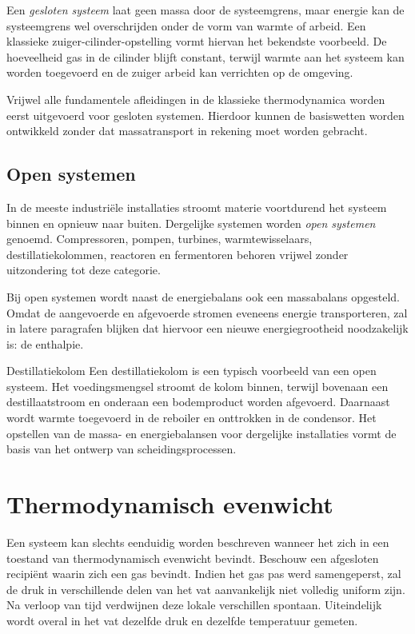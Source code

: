 Een \emph{gesloten systeem} laat geen massa door de systeemgrens, maar energie kan de systeemgrens wel overschrijden onder de vorm van warmte of arbeid. Een klassieke zuiger-cilinder-opstelling vormt hiervan het bekendste voorbeeld. De hoeveelheid gas in de cilinder blijft constant, terwijl warmte aan het systeem kan worden toegevoerd en de zuiger arbeid kan verrichten op de omgeving.

Vrijwel alle fundamentele afleidingen in de klassieke thermodynamica worden eerst uitgevoerd voor gesloten systemen. Hierdoor kunnen de basiswetten worden ontwikkeld zonder dat massatransport in rekening moet worden gebracht.

\subsection{Open systemen}

In de meeste industri\"ele installaties stroomt materie voortdurend het systeem binnen en opnieuw naar buiten. Dergelijke systemen worden \emph{open systemen} genoemd. Compressoren, pompen, turbines, warmtewisselaars, destillatiekolommen, reactoren en fermentoren behoren vrijwel zonder uitzondering tot deze categorie.

Bij open systemen wordt naast de energiebalans ook een massabalans opgesteld. Omdat de aangevoerde en afgevoerde stromen eveneens energie transporteren, zal in latere paragrafen blijken dat hiervoor een nieuwe energiegrootheid noodzakelijk is: de enthalpie.

\begin{toepassing}{Destillatiekolom}
Een destillatiekolom is een typisch voorbeeld van een open systeem. Het voedingsmengsel stroomt de kolom binnen, terwijl bovenaan een destillaatstroom en onderaan een bodemproduct worden afgevoerd. Daarnaast wordt warmte toegevoerd in de reboiler en onttrokken in de condensor. Het opstellen van de massa- en energiebalansen voor dergelijke installaties vormt de basis van het ontwerp van scheidingsprocessen.
\end{toepassing}

\section{Thermodynamisch evenwicht}

Een systeem kan slechts eenduidig worden beschreven wanneer het zich in een toestand van thermodynamisch evenwicht bevindt. Beschouw een afgesloten recipi\"ent waarin zich een gas bevindt. Indien het gas pas werd samengeperst, zal de druk in verschillende delen van het vat aanvankelijk niet volledig uniform zijn. Na verloop van tijd verdwijnen deze lokale verschillen spontaan. Uiteindelijk wordt overal in het vat dezelfde druk en dezelfde temperatuur gemeten.

